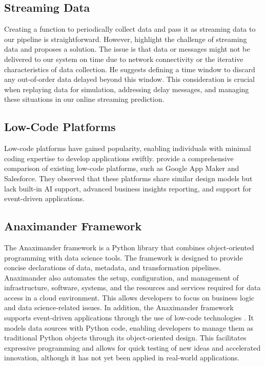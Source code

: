 \documentclass{report}
\begin{document}
\subsection{Streaming Data}
 Creating a function to periodically collect data and pass it as streaming data to our pipeline is straightforward. However, \citet{damji2020learning} highlight the challenge of streaming data and proposes a solution. The issue is that data or messages might not be delivered to our system on time due to network connectivity or the iterative characteristics of data collection. He suggests defining a time window to discard any out-of-order data delayed beyond this window. This consideration is crucial when replaying data for simulation, addressing delay messages, and managing these situations in our online streaming prediction.

\subsection{Low-Code Platforms}
 Low-code platforms have gained popularity, enabling individuals with minimal coding expertise to develop applications swiftly. \citet{sahay2020supporting} provide a comprehensive comparison of existing low-code platforms, such as Google App Maker and Salesforce. They observed that these platforms share similar design models but lack built-in AI support, advanced business insights reporting, and support for event-driven applications.

\subsection{Anaximander Framework}
 The Anaximander framework is a Python library that combines object-oriented programming with data science tools. The framework is designed to provide concise declarations of data, metadata, and transformation pipelines. Anaximander also automates the setup, configuration, and management of infrastructure, software, systems, and the resources and services required for data access in a cloud environment. This allows developers to focus on business logic and data science-related issues. In addition, the Anaximander framework supports event-driven applications through the use of low-code technologies \autocite{jd2021anaximander}. It models data sources with Python code, enabling developers to manage them as traditional Python objects through its object-oriented design. This facilitates expressive programming and allows for quick testing of new ideas and accelerated innovation, although it has not yet been applied in real-world applications.
\end{document}
